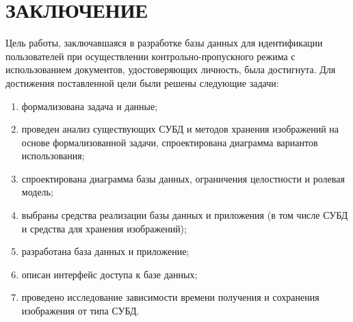 \chapter*{ЗАКЛЮЧЕНИЕ}

Цель работы, заключавшаяся в разработке базы данных для идентификации пользователей при осуществлении контрольно-пропускного режима с использованием документов, удостоверяющих личность, была достигнута.
Для достижения поставленной цели были решены следующие задачи:
\begin{enumerate}
	\item формализована задача и данные;
	\item проведен анализ существующих СУБД и методов хранения изображений на основе формализованной задачи, спроектирована диаграмма вариантов использования;
	\item спроектирована диаграмма базы данных, ограничения целостности и ролевая модель;
	\item выбраны средства реализации базы данных и приложения (в том числе СУБД и средства для хранения изображений);
	\item разработана база данных и приложение;
	\item описан интерфейс доступа к базе данных;
	\item проведено исследование зависимости времени получения и сохранения изображения от типа СУБД.
\end{enumerate}
